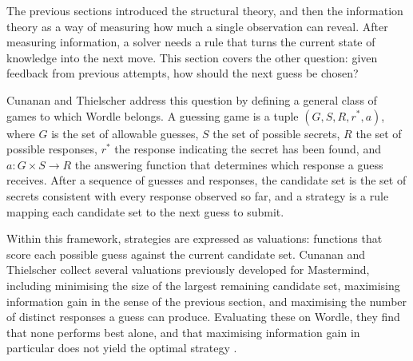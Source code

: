 \label{sec:strategies}
The previous sections introduced the structural theory, and then the information theory as a way of measuring how much a single observation can reveal. After measuring information, a solver needs a rule that turns the current state of knowledge into the next move. This section covers the other question: given feedback from previous attempts, how should the next guess be chosen?

Cunanan and Thielscher \cite{cunananOptimalStrategiesWordle2023} address this question by defining a general class of games to which Wordle belongs. A guessing game is a tuple $(G, S, R, r^*, a)$, where $G$ is the set of allowable guesses, $S$ the set of possible secrets, $R$ the set of possible responses, $r^*$ the response indicating the secret has been found, and $a: G \times S \to R$ the answering function that determines which response a guess receives. After a sequence of guesses and responses, the candidate set is the set of secrets consistent with every response observed so far, and a strategy is a rule mapping each candidate set to the next guess to submit.

Within this framework, strategies are expressed as valuations: functions that score each possible guess against the current candidate set. Cunanan and Thielscher collect several valuations previously developed for Mastermind, including minimising the size of the largest remaining candidate set, maximising information gain in the sense of the previous section, and maximising the number of distinct responses a guess can produce. Evaluating these on Wordle, they find that none performs best alone, and that maximising information gain in particular does not yield the optimal strategy \cite{cunananOptimalStrategiesWordle2023}.